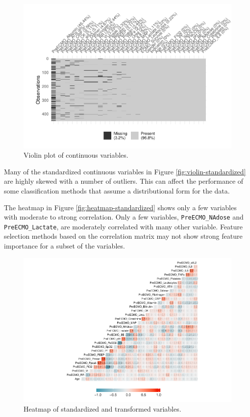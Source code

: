 \documentclass[12pt,]{article}
\begin{document}
\begin{figure}[H]

{\centering \includegraphics[width=1\linewidth]{figure/graphics-unnamed-chunk-4-1} 

}

\caption{\label{fig:violin-standardized}Violin plot of continuous variables.}\label{fig:unnamed-chunk-4}
\end{figure}

Many of the standardized continuous variables in Figure
\ref{fig:violin-standardized} are highly skewed with a number of
outliers. This can affect the performance of some classification methods
that assume a distributional form for the data.

The heatmap in Figure \ref{fig:heatmap-standardized} shows only a few
variables with moderate to strong correlation. Only a few variables,
\texttt{PreECMO\_NAdose} and \texttt{PreECMO\_Lactate}, are moderately
correlated with many other variable. Feature selection methods based on
the correlation matrix may not show strong feature importance for a
subset of the variables.

\begin{figure}[H]

{\centering \includegraphics[width=1\linewidth]{figure/graphics-unnamed-chunk-5-1} 

}

\caption{\label{fig:heatmap-standardized}Heatmap of standardized and transformed variables.}\label{fig:unnamed-chunk-5}
\end{figure}
\end{document}
